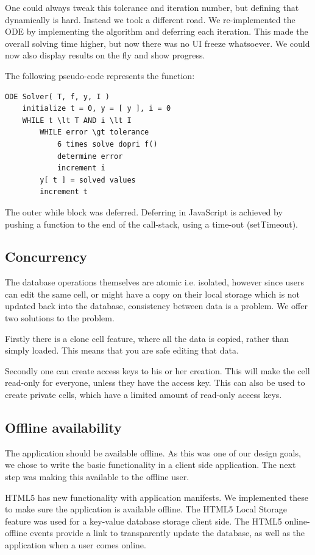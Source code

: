 \documentclass[10pt,a4paper]{report}
\begin{document}
			One could always tweak this tolerance and iteration number, but defining that dynamically is hard. Instead we took a different road. We re-implemented the ODE by implementing the algorithm and deferring each iteration. This made the overall solving time higher, but now there was no UI freeze whatsoever. We could now also display results on the fly and show progress.
			
			The following pseudo-code represents the function:
			
			\begin{lstlisting}
ODE Solver( T, f, y, I )
	initialize t = 0, y = [ y ], i = 0
	WHILE t \lt T AND i \lt I
		WHILE error \gt tolerance
			6 times solve dopri f()
			determine error
			increment i
		y[ t ] = solved values
		increment t
			\end{lstlisting}

			The outer while block was deferred. Deferring in JavaScript is achieved by pushing a function to the end of the call-stack, using a time-out (setTimeout).
			\clearpage
		
		\subsection{Concurrency}
			The database operations themselves are atomic i.e. isolated, however since users can edit the same cell, or might have a copy on their local storage which is not updated back into the database, consistency between data is a problem. We offer two solutions to the problem.
			
			Firstly there is a clone cell feature, where all the data is copied, rather than simply loaded. This means that you are safe editing that data.
			
			Secondly one can create access keys to his or her creation. This will make the cell read-only for everyone, unless they have the access key. This can also be used to create private cells, which have a limited amount of read-only access keys.
		
		\subsection{Offline availability}
			The application should be available offline. As this was one of our design goals, we chose to write the basic functionality in a client side application. The next step was making this available to the offline user.
			
			HTML5 has new functionality with application manifests. We implemented these to make sure the application is available offline. The HTML5 Local Storage feature was used for a key-value database storage client side. The HTML5 online-offline events provide a link to transparently update the database, as well as the application when a user comes online.
			
\end{document}
